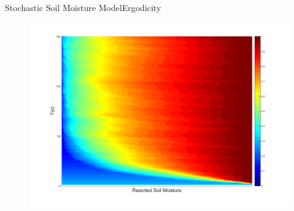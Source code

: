 \documentclass[10pt]{beamer}
\begin{document}
\begin{frame}{Stochastic Soil Moisture Model}{Ergodicity}
\begin{figure}
\centering
\includegraphics[width=.91\textwidth]{s_sort.png}
\end{figure}
\end{frame}
\end{document}
